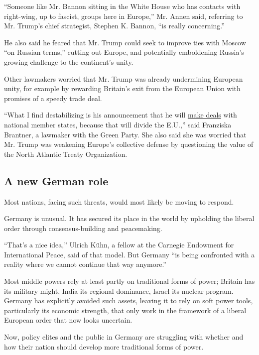 ``Someone like Mr. Bannon sitting in the White House who has contacts
with right-wing, up to fascist, groups here in Europe,'' Mr. Annen said,
referring to Mr. Trump's chief strategist, Stephen K. Bannon, ``is
really concerning.''

He also said he feared that Mr. Trump could seek to improve ties with
Moscow ``on Russian terms,'' cutting out Europe, and potentially
emboldening Russia's growing challenge to the continent's unity.

Other lawmakers worried that Mr. Trump was already undermining European
unity, for example by rewarding Britain's exit from the European Union
with promises of a speedy trade deal.

``What I find destabilizing is his announcement that he will
\href{https://insidetrade.com/daily-news/eu-member-states-suggest-trump-bilateral-overtures-product-white-house-influence}{make
deals} with national member states, because that will divide the E.U.,''
said Franziska Brantner, a lawmaker with the Green Party. She also said
she was worried that Mr. Trump was weakening Europe's collective defense
by questioning the value of the North Atlantic Treaty Organization.

\hypertarget{a-new-german-role}{%
\subsection{A new German role}\label{a-new-german-role}}

Most nations, facing such threats, would most likely be moving to
respond.

Germany is unusual. It has secured its place in the world by upholding
the liberal order through consensus-building and peacemaking.

``That's a nice idea,'' Ulrich Kühn, a fellow at the Carnegie Endowment
for International Peace, said of that model. But Germany ``is being
confronted with a reality where we cannot continue that way anymore.''

Most middle powers rely at least partly on traditional forms of power;
Britain has its military might, India its regional dominance, Israel its
nuclear program. Germany has explicitly avoided such assets, leaving it
to rely on soft power tools, particularly its economic strength, that
only work in the framework of a liberal European order that now looks
uncertain.

Now, policy elites and the public in Germany are struggling with whether
and how their nation should develop more traditional forms of power.

